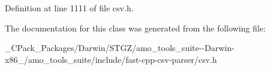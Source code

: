 Definition at line 1111 of file csv.\+h.



The documentation for this class was generated from the following file\+:\begin{DoxyCompactItemize}
\item 
\+\_\+\+C\+Pack\+\_\+\+Packages/\+Darwin/\+S\+T\+G\+Z/amo\+\_\+tools\+\_\+suite-\/-\/\+Darwin-\/x86\+\_/amo\+\_\+tools\+\_\+suite/include/fast-\/cpp-\/csv-\/parser/csv.\+h\end{DoxyCompactItemize}

